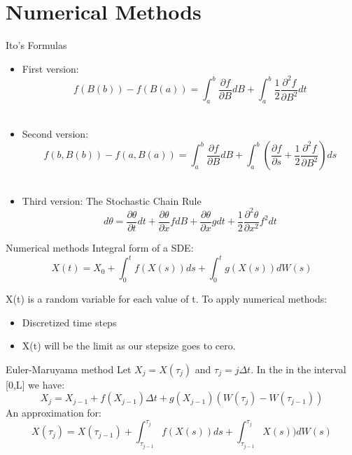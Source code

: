 
\section{Numerical Methods}

\begin{frame}{Ito's Formulas}
  	\begin{itemize}
   		\item First version: $$f(B(b))-f(B(a))=\int_{a}^{b}{\frac{\partial f}{\partial B} 				dB}+\int_{a}^{b}{\frac{1}{2} \frac{\partial^2 f}{\partial B^2} dt} $$\\
    		\item Second version: $$f(b,B(b))-f(a,B(a))=\int_{a}^{b}{\frac{\partial f}{\partial B} 			dB}+\int_{a}^{b}{(\frac{\partial f}{\partial s}+\frac{1}{2}\frac{\partial ^2 f}{\partial 		B^2}) ds}$$\\
  		\item  Third version: The Stochastic Chain Rule $$d\theta=\frac{\partial\theta}{\partial 		t}dt+\frac{\partial\theta}{\partial x}f dB+\frac{\partial\theta}{\partial x}g 					dt+\frac{1}{2}\frac{\partial^2\theta}{\partial x^2}f^2dt$$
  	\end{itemize}
\end{frame}

\begin{frame}{Numerical methods}
Integral form of a SDE: 
$$X(t)=X_0+\int_{0}^{t}f(X(s))ds+\int_{0}^{t}g(X(s))dW(s)$$

X(t) is a random variable for each value of t. To apply numerical methods:
	\begin{itemize}
		\item Discretized time steps	
		\item X(t) will be the limit as our stepsize goes to cero.
	\end{itemize}
\end{frame}

\begin{frame}{Euler-Maruyama method}
Let $X_j=X(\tau_j)$ and $\tau_j=j\Delta t$. In the in the interval [0,L] we have:\bigskip\\
$$X_j=X_{j-1}+f(X_{j-1})\Delta t+g(X_{j-1})(W(\tau_j)-W(\tau_{j-1}))$$
 An approximation for:
$$X(\tau_j)=X(\tau_{j-1})+\int_{\tau_{j-1}}^{\tau_{j}}f(X(s))ds+\int_
{\tau_{j-1}}^{\tau_{j}}X(s))dW(s)$$
\end{frame}

